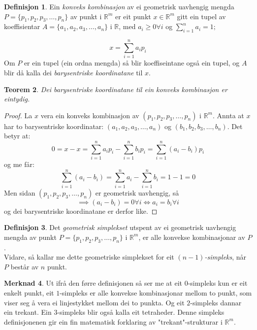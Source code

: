 \documentclass[a4paper, titlepage, 12pt, norsk]{article}
\theoremstyle{plain}
\newtheorem{theorem}{Teorem}[section]
\theoremstyle{definition}
\newtheorem{definition}[theorem]{Definisjon}
\newtheorem{remark}[theorem]{Merknad}
\newcommand{\Rb}{\mathbb{R}}
\begin{document}
\begin{theroem}
\begin{definition}
	\sloppy Ein \emph{konveks kombinasjon} av ei geometrisk uavhengig mengda $P=\{p_1, p_2, p_3, \dots, p_n\}$ av punkt i $\Rb^m$ er eit punkt $x\in\Rb^m$ gitt ein tupel av koeffisientar $A=\{a_1, a_2, a_3, \dots, a_n\}$ i $\Rb$, med $a_i\geq0\forall i$ og $\sum_{i=1}^n a_i = 1;$
	
	\begin{equation*}
		x=\sum_{i=1}^n a_ip_i
	\end{equation*}
	Om $P$ er ein tupel (ein ordna mengda) så blir koeffiseintane også ein tupel, og $A$ blir då kalla dei \emph{barysentriske koordinatane} til $x$.
\end{definition}

\begin{theorem}
	Dei barysentriske koordinatane til ein konveks kombinasjon er eintydig.
\end{theorem}
\begin{proof}
	La $x$ vera ein konveks kombinasjon av $(p_1, p_2, p_3, \dots, p_n)$ i $\Rb^m$. Annta at $x$ har to barysentriske koordinatar: $(a_1, a_2, a_3, \dots, a_n)$ og $(b_1, b_2, b_3, \dots, b_n)$. Det betyr at:
	\begin{equation*}
		0 = x - x = \sum_{i=1}^n a_ip_i - \sum_{i=1}^n b_ip_i=\sum_{i=1}^n (a_i-b_i)p_i
	\end{equation*}
	og me får:
	\begin{equation*}
		\sum_{i=1}^n(a_i-b_i)=\sum_{i=1}^na_i - \sum_{i=1}^nb_i = 1 - 1 = 0
	\end{equation*}
	Men sidan $(p_1, p_2, p_3, \dots, p_n)$ er geometrisk uavhengig, så 
	\begin{equation*}
		\implies (a_i-b_i)=0\forall i \Longleftrightarrow a_i = b_i \forall i
	\end{equation*}
	og dei barysentriske koordinatane er derfor like.
\end{proof}

\begin{definition}
	Det \emph{geometrisk simplekset} utspent av ei geometrisk uavhengig mengda av punkt $P=\{p_1, p_2, p_3, \dots, p_n\}$ i $\Rb^m$, er alle konvekse kombinasjonar av $P$.
	\\Vidare, så kallar me dette geometriske simplekset for eit \emph{$(n-1)$-simpleks}, når $P$ består av $n$ punkt.
\end{definition}

\begin{remark}
	Ut ifrå den førre definisjonen så ser me at eit $0$-simpleks kun er eit enkelt punkt, eit $1$-simpleks er alle konvekse kombinasjonar mellom to punkt, som viser seg å vera ei linjestykket mellom dei to punkta. Og eit $2$-simpleks dannar ein trekant. Ein $3$-simpleks blir også kalla eit tetraheder. Denne simpleks definisjonenen gir ein fin matematisk forklaring av "trekant"-strukturar i $\Rb^m$.
\end{remark}


\end{theroem}
\end{document}
